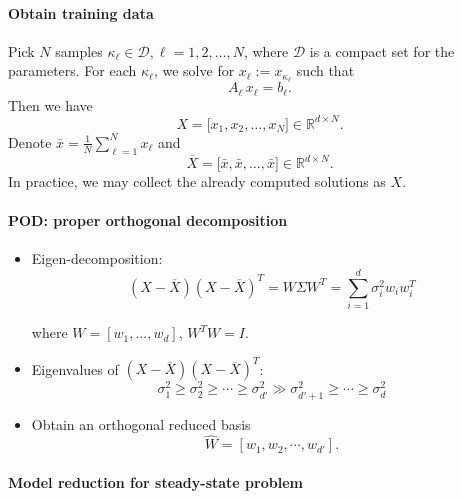 \paragraph{Obtain training data}
Pick $N$ samples $\kappa_\ell \in \mathcal{D}, \ell=1, 2, \ldots, N$, where $\mathcal{D}$ is a compact set for the parameters. For each $\kappa_\ell$, we solve for $x_\ell:=x_{\kappa_\ell}$ such that
$$
A_{\ell} \, x_\ell = b_{\ell}.
$$
Then we have 
$$
X = \Big[ x_1,x_2, \ldots, x_N \Big] \in \mathbb{R}^{d\times N}.
$$
Denote $\bar{x} = \frac{1}{N}\sum_{\ell=1}^{N} x_{\ell}$ and 
$$
\overline{X} = \Big[\bar{x},\bar{x}, \ldots, \bar{x} \Big] \in \mathbb{R}^{d\times N}.
$$
In practice, we may collect the already computed solutions as $X$.

\paragraph{POD: proper orthogonal decomposition}

\begin{itemize}\setlength{\itemsep}{10pt}
\item Eigen-decomposition: $$(X-\overline{X})(X-\overline{X})^T=W \Sigma W^T=\sum_{i=1}^d \sigma^2_i w_i w_i^T$$

where $W=[w_1,...,w_d]$, $W^TW=I$.
\item Eigenvalues of $(X-\overline{X})(X-\overline{X})^T$: 
$$
\sigma_1^2 \ge \sigma_2^2 \ge \cdots \ge \sigma^2_{d'}\gg  \sigma^2_{d'+1}\ge \cdots\ge \sigma^2_d
$$
\item Obtain an orthogonal reduced basis
$$
\hat W=[w_1,w_2,\cdots,w_{d'}].
$$
\end{itemize}

\paragraph{Model reduction for steady-state problem}


